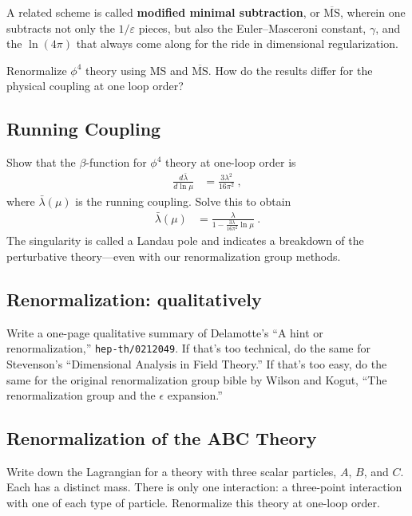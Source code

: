 \documentclass[12pt]{article}
\numberwithin{equation}{subsection}    %
\begin{document}
{A related scheme is called \textbf{modified minimal subtraction}, or $\overline{\text{MS}}$, wherein one subtracts not only the $1/\varepsilon$ pieces, but also the Euler--Masceroni constant, $\gamma$, and the $\ln(4\pi)$ that always come along for the ride in dimensional regularization. 

Renormalize $\phi^4$ theory using MS and $\overline{\text{MS}}$. How do the results differ for the physical coupling at one loop order?

\subsection{Running Coupling}

Show that the $\beta$-function for $\phi^4$ theory at one-loop order is
\begin{align}
	\frac{d\bar\lambda}{d\ln\mu} &= \frac{3\lambda^2}{16\pi^2} \ ,
\end{align}
where $\bar\lambda(\mu)$ is the running coupling. Solve this to obtain
\begin{align}
	\bar\lambda(\mu)
	&= \frac{\lambda}{1 -\frac{3\lambda}{16\pi^2}\ln\mu} \ .
\end{align}
The singularity is called a Landau pole and indicates a breakdown of the perturbative theory---even with our renormalization group methods.

\subsection{Renormalization: qualitatively}

Write a one-page qualitative summary of Delamotte's ``A hint or renormalization,'' \texttt{hep-th/0212049}. If that's too technical, do the same for Stevenson's ``Dimensional Analysis in Field Theory.''  If that's too easy, do the same for the original renormalization group bible by Wilson and Kogut, ``The renormalization group and the $\epsilon$ expansion.''


\subsection{Renormalization of the ABC Theory}

Write down the Lagrangian for a theory with three scalar particles, $A$, $B$, and $C$. Each has a distinct mass. There is only one interaction: a three-point interaction with one of each type of particle. Renormalize this theory at one-loop order. 

}
\end{document}
